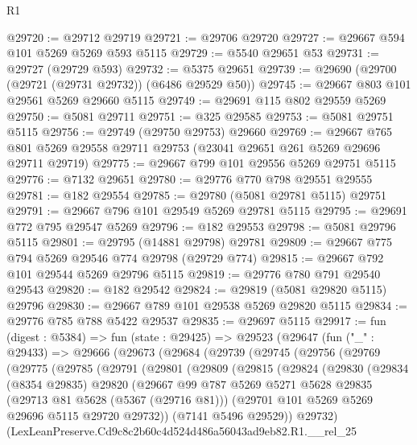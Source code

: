 \begin{lexlean}{R1}
\begin{coremodule}
@29720 := @29712 @29719
@29721 := @29706 @29720
@29727 := @29667 @594 @101 @5269 @5269 @593 @5115
@29729 := @5540 @29651 @53
@29731 := @29727 (@29729 @593)
@29732 := @5375 @29651
@29739 := @29690 (@29700 (@29721 (@29731 @29732)) (@6486 @29529 @50))
@29745 := @29667 @803 @101 @29561 @5269 @29660 @5115
@29749 := @29691 @115 @802 @29559 @5269
@29750 := @5081 @29711
@29751 := @325 @29585
@29753 := @5081 @29751 @5115
@29756 := @29749 (@29750 @29753) @29660
@29769 := @29667
    @765
    @801
    @5269
    @29558
    @29711
    @29753
    (@23041 @29651 @261 @5269 @29696 @29711 @29719)
@29775 := @29667 @799 @101 @29556 @5269 @29751 @5115
@29776 := @7132 @29651
@29780 := @29776 @770 @798 @29551 @29555
@29781 := @182 @29554
@29785 := @29780 (@5081 @29781 @5115) @29751
@29791 := @29667 @796 @101 @29549 @5269 @29781 @5115
@29795 := @29691 @772 @795 @29547 @5269
@29796 := @182 @29553
@29798 := @5081 @29796 @5115
@29801 := @29795 (@14881 @29798) @29781
@29809 := @29667 @775 @794 @5269 @29546 @774 @29798 (@29729 @774)
@29815 := @29667 @792 @101 @29544 @5269 @29796 @5115
@29819 := @29776 @780 @791 @29540 @29543
@29820 := @182 @29542
@29824 := @29819 (@5081 @29820 @5115) @29796
@29830 := @29667 @789 @101 @29538 @5269 @29820 @5115
@29834 := @29776 @785 @788 @5422 @29537
@29835 := @29697 @5115
@29917 := fun (digest : @5384) =>
  fun (state : @29425) =>
  @29523
    (@29647
      (fun ("_" : @29433) =>
      @29666
        (@29673
          (@29684
            (@29739
              (@29745
                (@29756
                  (@29769
                    (@29775
                      (@29785
                        (@29791
                          (@29801
                            (@29809
                              (@29815
                                (@29824
                                  (@29830
                                    (@29834
                                      (@8354 @29835)
                                      @29820
                                      (@29667
                                        @99
                                        @787
                                        @5269
                                        @5271
                                        @5628
                                        @29835
                                        (@29713 @81 @5628 (@5367 (@29716 @81)))
                                        (@29701 @101 @5269 @5269 @29696 @5115 @29720 @29732))
                                      (@7141 @5496 @29529))
                                    @29732)
                                  (LexLeanPreserve.Cd9c8c2b60c4d524d486a56043ad9eb82.R1.__rel_25

\end{coremodule}
\end{lexlean}
